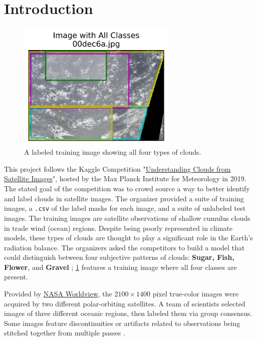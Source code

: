 \section{Introduction}
\begin{figure}
    \centering
    \includegraphics[width=3in]{figs/all_labels.png}
    \caption{A labeled training image showing all four types of clouds.}
    \label{fig:all_labels}
\end{figure}
%
This project follows the Kaggle Competition "\href{https://www.kaggle.com/competitions/understanding_cloud_organization/overview}{Understanding Clouds from Satellite Images}", hosted by the Max Planck Institute for Meteorology in 2019. The stated goal of the competition was to crowd source a way to better identify and label clouds in satellite images. The organizer provided a suite of training images, a \texttt{.csv} of the label masks for each image, and a suite of unlabeled test images. The training images are satellite observations of shallow cumulus clouds in trade wind (ocean) regions. Despite being poorly represented in climate models, these types of clouds are thought to play a significant role in the Earth's radiation balance. The organizers asked the competitors to build a model that could distinguish between four subjective patterns of clouds: \textbf{Sugar, Fish, Flower}, and \textbf{Gravel} \cite{rasp_CombiningCrowdsourcingDeep_2020, maxplanckinstituteformeteorology_UnderstandingCloudsSatellite_}; \cref{fig:all_labels} features a training image where all four classes are present. 

Provided by \href{https://worldview.earthdata.nasa.gov/}{NASA Worldview}, the \(2100 \times 1400\) pixel true-color images were acquired by two different polar-orbiting satellites.  A team of scientists selected images of three different oceanic regions, then labeled them via group consensus. Some images feature discontinuities or artifacts related to observations being stitched together from multiple passes \cite{maxplanckinstituteformeteorology_UnderstandingCloudsSatellite_}. 
%
